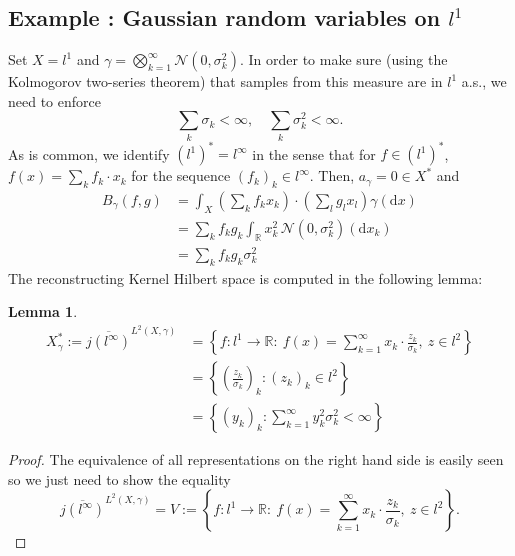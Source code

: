 \documentclass{scrartcl}
\newtheorem{lemma}{Lemma}
\theoremstyle{definition}
\theoremstyle{remark}
\newcommand*\circled[1]{\tikz[baseline=(char.base)]{
            \node[shape=circle,draw,inner sep=2pt] (char) {#1};}}
\DeclareRobustCommand{\myboxtwo}[2][blue!20]{%
\begin{tcolorbox}[   %
        breakable,
        left=0pt,
        right=0pt,
        top=0pt,
        bottom=0pt,
        colback=#1,
        colframe=#1,
        width=\dimexpr\textwidth\relax, 
        enlarge left by=0mm,
        boxsep=5pt,
        arc=10pt,outer arc=10pt,
        ]
        #2
\end{tcolorbox}
}
\begin{document}
\myboxtwo{
\subsection*{Example \circled{5}: Gaussian random variables on $l^1$}
Set $X = l^1$ and $\gamma = \bigotimes_{k=1}^\infty \mathcal N(0, \sigma_k^2)$. In order to make sure (using the Kolmogorov two-series theorem) that samples from this measure are in $l^1$ a.s., we need to enforce
\begin{displaymath}
\sum_k \sigma_k < \infty,\quad \sum_k \sigma_k^2 < \infty.
\end{displaymath}
As is common, we identify $(l^1)^* = l^\infty$ in the sense that for $f\in (l^1)^*$, $f(x) = \sum_k f_k\cdot x_k$ for the sequence $(f_k)_k \in l^\infty$. 
Then, $a_\gamma = 0\in X^*$ and 
\begin{align*}
B_\gamma(f,g) &= \int_X \left(\sum_k f_k x_k\right) \cdot \left(\sum_l g_l x_l\right) \gamma(\mathrm d x)\\
&= \sum_{k} f_k g_k \int_{\mathbb R} x_k^2 \,\mathcal N(0, \sigma_k^2)(\mathrm d x_k)\\
&= \sum_k f_k g_k \sigma_k^2
\end{align*}
The reconstructing Kernel Hilbert space is computed in the following lemma:
\begin{lemma}
\begin{align*}
X_\gamma^* := \overline{j(l^\infty)}^{L^2(X,\gamma)} &= \left\{f: l^1\to \mathbb R: ~ f(x) = \sum_{k=1}^\infty x_k\cdot \frac{z_k}{\sigma_k},~ z\in l^2\right\}\\
&= \left\{\left(\frac{z_k}{\sigma_k}\right)_k: (z_k)_k \in l^2\right\}\\
&= \left\{(y_k)_k: \sum_{k=1}^\infty y_k^2\sigma_k^2 < \infty\right\}\end{align*}
\end{lemma}
\begin{proof}
The equivalence of all representations on the right hand side is easily seen so we just need to show the equality 
\[ \overline{j(l^\infty)}^{L^2(X,\gamma)} = V:= \left\{f: l^1\to \mathbb R: ~ f(x) = \sum_{k=1}^\infty x_k\cdot \frac{z_k}{\sigma_k},~ z\in l^2\right\}.\]

\end{proof}}
\end{document}
